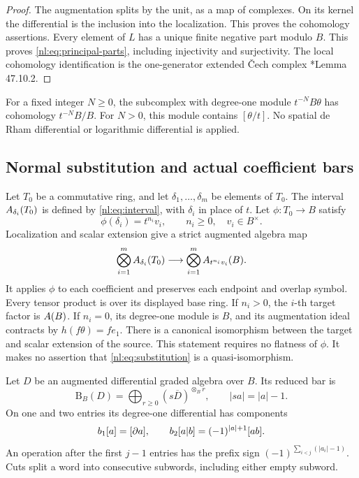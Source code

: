 \begin{proof}
The augmentation splits by the unit, as a map of complexes.
On its kernel the differential is the inclusion into the localization.
This proves the cohomology assertions. Every element of \(L\)
has a unique finite negative part modulo \(B\). This proves
\eqref{nl:eq:principal-parts}, including injectivity and surjectivity.
The local cohomology identification is the one-generator extended
\v{C}ech complex \cite{stacks-local}*{Lemma 47.10.2}.
\end{proof}

For a fixed integer \(N\geq0\), the subcomplex with degree-one
module \(t^{-N}B\theta\) has cohomology \(t^{-N}B/B\).
For \(N>0\), this module contains \([\theta/t]\).
No spatial de Rham differential or logarithmic differential is applied.

\subsection{Normal substitution and actual coefficient bars}

Let \(T_0\) be a commutative ring, and let
\(\delta_1,\ldots,\delta_m\) be elements of \(T_0\).
The interval \(A_{\delta_i}(T_0)\) is defined by
\eqref{nl:eq:interval}, with \(\delta_i\) in place of \(t\).
Let \(\phi:T_0\to B\) satisfy
\[
 \phi(\delta_i)=t^{n_i}v_i,\qquad n_i\geq0,\quad v_i\in B^\times.
\]
Localization and scalar extension give a strict augmented algebra map
\begin{equation}\label{nl:eq:substitution}
 \bigotimes_{i=1}^mA_{\delta_i}(T_0)
   \longrightarrow
 \bigotimes_{i=1}^mA_{t^{n_i}v_i}(B).
\end{equation}
It applies \(\phi\) to each coefficient and preserves each endpoint
and overlap symbol. Every tensor product is over its displayed base ring.
If \(n_i>0\), the \(i\)-th target factor is \(A(B)\).
If \(n_i=0\), its degree-one module is \(B\), and its augmentation
ideal contracts by \(h(f\theta)=fe_1\).
There is a canonical isomorphism between the target and scalar extension
of the source. This statement requires no flatness of \(\phi\).
It makes no assertion that \eqref{nl:eq:substitution} is a quasi-isomorphism.

Let \(D\) be an augmented differential graded algebra over \(B\).
Its reduced bar is
\[
 \mathrm B_B(D)=\bigoplus_{r\geq0}(s\overline D)^{\otimes_B r},
 \qquad |sa|=|a|-1.
\]
On one and two entries its degree-one differential has components
\begin{equation}\label{nl:eq:bar}
 b_1[a]=[\partial a],\qquad
 b_2[a|b]=(-1)^{|a|+1}[ab].
\end{equation}
An operation after the first \(j-1\) entries has the prefix sign
\((-1)^{\sum_{i<j}(|a_i|-1)}\). Cuts split a word into consecutive
subwords, including either empty subword.

